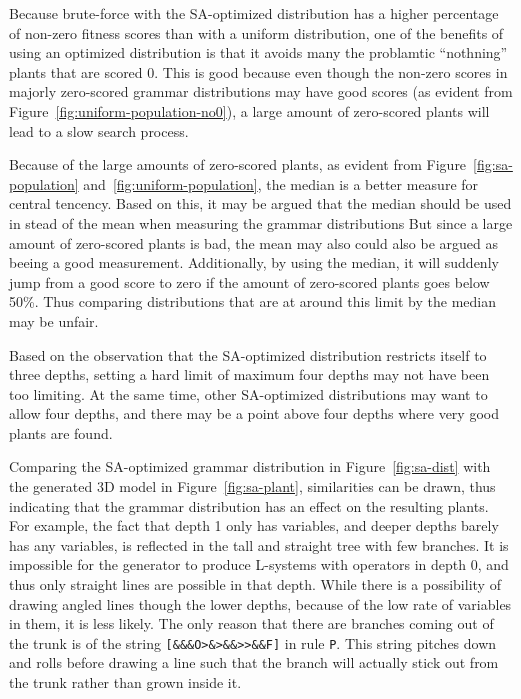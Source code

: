 Because brute-force with the SA-optimized distribution has a higher percentage of non-zero fitness scores than with a uniform distribution, one of the benefits of using an optimized distribution is that it avoids many the problamtic ``nothning'' plants that are scored 0.
This is good because even though the non-zero scores in majorly zero-scored grammar distributions may have good scores (as evident from Figure~\ref{fig:uniform-population-no0}), a large amount of zero-scored plants will lead to a slow search process.

Because of the large amounts of zero-scored plants, as evident from Figure~\ref{fig:sa-population} and~\ref{fig:uniform-population}, the median is a better measure for central tencency.
Based on this, it may be argued that the median should be used in stead of the mean when measuring the grammar distributions
But since a large amount of zero-scored plants is bad, the mean may also could also be argued as beeing a good measurement.
Additionally, by using the median, it will suddenly jump from a good score to zero if the amount of zero-scored plants goes below 50\%.
Thus comparing distributions that are at around this limit by the median may be unfair.

Based on the observation that the SA-optimized distribution restricts itself to three depths, setting a hard limit of maximum four depths may not have been too limiting.
At the same time, other SA-optimized distributions may want to allow four depths, and there may be a point above four depths where very good plants are found.

Comparing the SA-optimized grammar distribution in Figure~\ref{fig:sa-dist} with the generated 3D model in Figure~\ref{fig:sa-plant}, similarities can be drawn, thus indicating that the grammar distribution has an effect on the resulting plants.
For example, the fact that depth 1 only has variables, and deeper depths barely has any variables, is reflected in the tall and straight tree with few branches.
It is impossible for the generator to produce L-systems with operators in depth 0, and thus only straight lines are possible in that depth.
While there is a possibility of drawing angled lines though the lower depths, because of the low rate of variables in them, it is less likely.
The only reason that there are branches coming out of the trunk is of the string \texttt{[\&\&\&O>\&>\&\&>{}>\&\&F]} in rule \texttt{P}.
This string pitches down and rolls before drawing a line such that the branch will actually stick out from the trunk rather than grown inside it.

